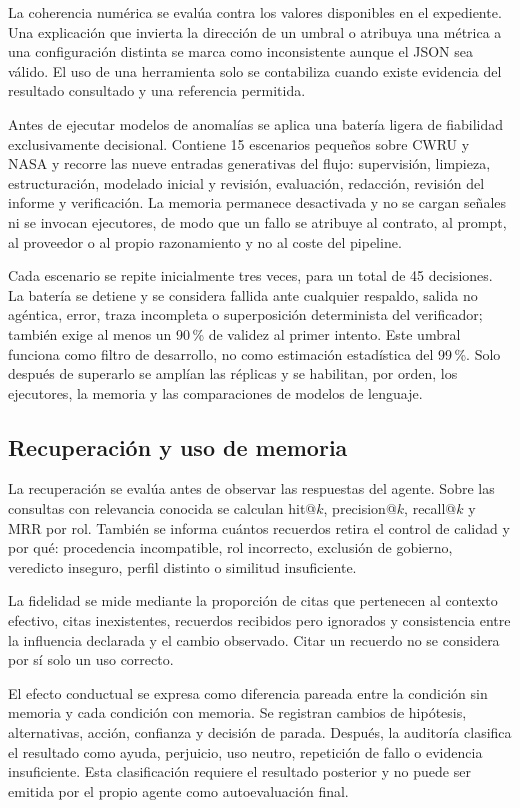 La coherencia numérica se evalúa contra los valores disponibles en el
expediente. Una explicación que invierta la dirección de un umbral o atribuya
una métrica a una configuración distinta se marca como inconsistente aunque el
JSON sea válido. El uso de una herramienta solo se contabiliza cuando existe
evidencia del resultado consultado y una referencia permitida.

Antes de ejecutar modelos de anomalías se aplica una batería ligera de
fiabilidad exclusivamente decisional. Contiene 15 escenarios pequeños sobre
CWRU y NASA y recorre las nueve entradas generativas del flujo: supervisión,
limpieza, estructuración, modelado inicial y revisión, evaluación, redacción,
revisión del informe y verificación. La memoria permanece desactivada y no se
cargan señales ni se invocan ejecutores, de modo que un fallo se atribuye al
contrato, al prompt, al proveedor o al propio razonamiento y no al coste del
pipeline.

Cada escenario se repite inicialmente tres veces, para un total de 45
decisiones. La batería se detiene y se considera fallida ante cualquier
respaldo, salida no agéntica, error, traza incompleta o superposición
determinista del verificador; también exige al menos un 90\,\% de validez al
primer intento. Este umbral funciona como filtro de desarrollo, no como
estimación estadística del 99\,\%. Solo después de superarlo se amplían las
réplicas y se habilitan, por orden, los ejecutores, la memoria y las
comparaciones de modelos de lenguaje.

\subsection{Recuperación y uso de memoria}

La recuperación se evalúa antes de observar las respuestas del agente. Sobre
las consultas con relevancia conocida se calculan hit@$k$, precision@$k$,
recall@$k$ y MRR por rol. También se informa cuántos recuerdos retira el control de calidad y
por qué: procedencia incompatible, rol incorrecto, exclusión de gobierno,
veredicto inseguro, perfil distinto o similitud insuficiente.

La fidelidad se mide mediante la proporción de citas que pertenecen al contexto
efectivo, citas inexistentes, recuerdos recibidos pero ignorados y consistencia
entre la influencia declarada y el cambio observado. Citar un recuerdo no se
considera por sí solo un uso correcto.

El efecto conductual se expresa como diferencia pareada entre la condición sin
memoria y cada condición con memoria. Se registran cambios de hipótesis,
alternativas, acción, confianza y decisión de parada. Después, la auditoría
clasifica el resultado como ayuda, perjuicio, uso neutro, repetición de fallo o
evidencia insuficiente. Esta clasificación requiere el resultado posterior y
no puede ser emitida por el propio agente como autoevaluación final.

